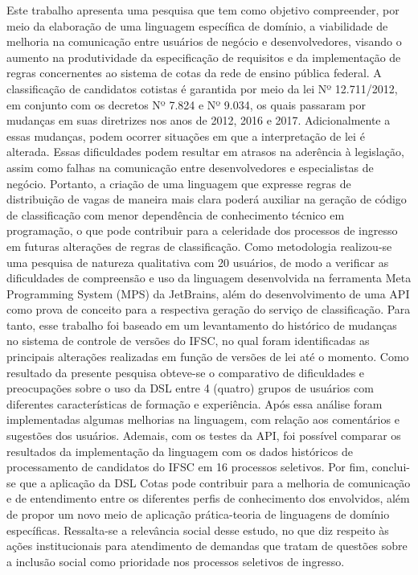 
\begin{resumo}[Resumo] \noindent 
Este trabalho apresenta uma pesquisa que tem como objetivo compreender, por meio da elaboração de uma linguagem específica de domínio, a viabilidade de melhoria na comunicação entre usuários de negócio e desenvolvedores, visando o aumento na produtividade da especificação de requisitos e da implementação de regras concernentes ao sistema de cotas da rede de ensino pública federal. A classificação de candidatos cotistas é garantida por meio da lei Nº 12.711/2012, em conjunto com os decretos Nº 7.824 e Nº 9.034, os quais passaram por mudanças em suas diretrizes nos anos de 2012, 2016 e 2017. Adicionalmente a essas mudanças, podem ocorrer situações em que a interpretação de lei é alterada. Essas dificuldades podem resultar em atrasos na aderência à legislação, assim como falhas na comunicação entre desenvolvedores e especialistas de negócio. Portanto, a criação de uma linguagem que expresse regras de distribuição de vagas de maneira mais clara poderá auxiliar na geração de código de classificação com menor dependência de conhecimento técnico em programação, o que pode contribuir para a celeridade dos processos de ingresso em futuras alterações de regras de classificação. Como metodologia realizou-se uma pesquisa de natureza qualitativa com 20 usuários, de modo a verificar as dificuldades de compreensão e uso da linguagem desenvolvida na ferramenta Meta Programming System (MPS) da JetBrains, além do desenvolvimento de uma \gls{API} como prova de conceito para a respectiva geração do serviço de classificação. Para tanto, esse trabalho foi baseado em um levantamento do histórico de mudanças no sistema de controle de versões do \gls{IFSC}, no qual foram identificadas as principais alterações realizadas em função de versões de lei até o momento. Como resultado da presente pesquisa obteve-se o comparativo de dificuldades e preocupações sobre o uso da DSL entre 4 (quatro) grupos de usuários com diferentes características de formação e experiência. Após essa análise foram implementadas algumas melhorias na linguagem, com relação aos comentários e sugestões dos usuários. Ademais, com os testes da \gls{API}, foi possível comparar os resultados da implementação da linguagem com os dados históricos de processamento de candidatos do IFSC em 16 processos seletivos. Por fim, conclui-se que a aplicação da DSL Cotas pode contribuir para a melhoria de comunicação e de entendimento entre os diferentes perfis de conhecimento dos envolvidos, além de propor um novo meio de aplicação prática-teoria de linguagens de domínio específicas. Ressalta-se a relevância social desse estudo, no que diz respeito às ações institucionais para atendimento de demandas que tratam de questões sobre a inclusão social como prioridade nos processos seletivos de ingresso.


\end{resumo}
